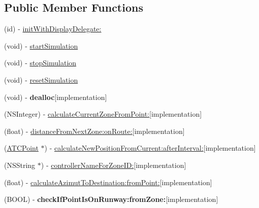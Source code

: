 \subsection*{\-Public \-Member \-Functions}
\begin{DoxyCompactItemize}
\item 
(id) -\/ \hyperlink{interface_environment_a949f18c6bc3e13c7e9a384e07f78ad60}{init\-With\-Display\-Delegate\-:}
\item 
(void) -\/ \hyperlink{interface_environment_a26a052e4413709c3f86409f116681e5f}{start\-Simulation}
\item 
(void) -\/ \hyperlink{interface_environment_a3083143effe80b2d3a5d18340f95933e}{stop\-Simulation}
\item 
(void) -\/ \hyperlink{interface_environment_abef32e5236a6cf77a3c0af62f9b4f8a0}{reset\-Simulation}
\item 
\hypertarget{interface_environment_ab03ecf0e3dbdabd32554205c560e996d}{
(void) -\/ {\bfseries dealloc}{\ttfamily  \mbox{[}implementation\mbox{]}}}
\label{interface_environment_ab03ecf0e3dbdabd32554205c560e996d}

\item 
(\-N\-S\-Integer) -\/ \hyperlink{interface_environment_aad3825ab9cebeacc656c9dd81d13e01d}{calculate\-Current\-Zone\-From\-Point\-:}{\ttfamily  \mbox{[}implementation\mbox{]}}
\item 
(float) -\/ \hyperlink{interface_environment_a877eabcf3de9386771a9a296fb9b5fe6}{distance\-From\-Next\-Zone\-:on\-Route\-:}{\ttfamily  \mbox{[}implementation\mbox{]}}
\item 
(\hyperlink{interface_a_t_c_point}{\-A\-T\-C\-Point} $\ast$) -\/ \hyperlink{interface_environment_afaa0307df5ae6e96037bf867d020bf7d}{calculate\-New\-Position\-From\-Current\-:after\-Interval\-:}{\ttfamily  \mbox{[}implementation\mbox{]}}
\item 
(\-N\-S\-String $\ast$) -\/ \hyperlink{interface_environment_ae5e0c4a273d295bbfb33bc4d964883a6}{controller\-Name\-For\-Zone\-I\-D\-:}{\ttfamily  \mbox{[}implementation\mbox{]}}
\item 
(float) -\/ \hyperlink{interface_environment_abdfaafe29461c4bf01b6ffb285c09355}{calculate\-Azimut\-To\-Destination\-:from\-Point\-:}{\ttfamily  \mbox{[}implementation\mbox{]}}
\item 
\hypertarget{interface_environment_ae06053e76e4af77ec00cf6c4169be74c}{
(\-B\-O\-O\-L) -\/ {\bfseries check\-If\-Point\-Is\-On\-Runway\-:from\-Zone\-:}{\ttfamily  \mbox{[}implementation\mbox{]}}}
\label{interface_environment_ae06053e76e4af77ec00cf6c4169be74c}


\end{DoxyCompactItemize}
